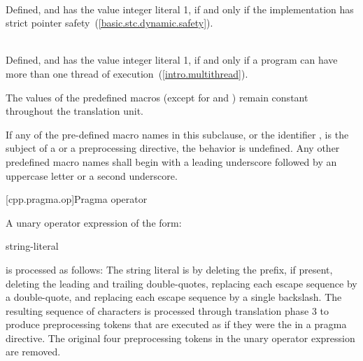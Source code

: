 \begin{description}
%
%
\item {}\\
Defined, and has the value integer literal 1, if and only if the implementation
has strict pointer safety~(\ref{basic.stc.dynamic.safety}).

%
%
\item {}\\
Defined, and has the value integer literal 1, if and only if a program
can have more than one thread of execution~(\ref{intro.multithread}).

\end{description}

\pnum
The values of the predefined macros
(except for
and
)
remain constant throughout the translation unit.

\pnum
If any of the pre-defined macro names in this subclause,
or the identifier
,
is the subject of a
or a
preprocessing directive,
the behavior is undefined.
Any other predefined macro names shall begin with a
leading underscore followed by an uppercase letter or a second
underscore.

[cpp.pragma.op]{Pragma operator}%
%

A unary operator expression of the form:

\begin{ncbnf}
 \terminal{(} string-literal \terminal{)}
\end{ncbnf}

is processed as follows: The string literal is 
by deleting the  prefix, if present, deleting the leading and trailing
double-quotes, replacing each escape sequence  by a double-quote, and
replacing each escape sequence \tcode{\textbackslash\textbackslash} by a single
backslash. The resulting sequence of characters is processed through translation phase 3
to produce preprocessing tokens that are executed as if they were the
 in a pragma directive. The original four preprocessing
tokens in the unary operator expression are removed.

